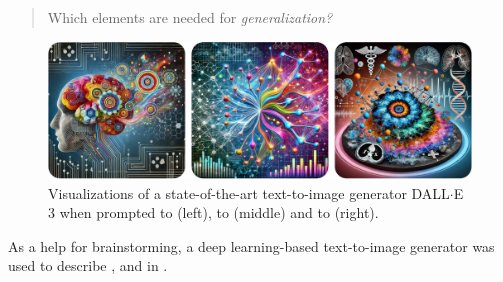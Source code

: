     \begin{quote}
        \centering \Large
        Which elements are needed for \emph{generalization?}
    \end{quote}

    \begin{figure}
        \includegraphics[width=\textwidth]{sections/01_introduction/figures/synthesized_generalization.pdf}
        \caption{Visualizations of a state-of-the-art text-to-image generator DALL$\cdot$E 3 \citep{xx} when prompted to  (left), to  (middle) and to  (right).}
        \label{fig:synthesized_generalization}
    \end{figure}

    As a help for brainstorming, a deep learning-based text-to-image generator \citep{xx} was used to describe ,  and  in .

